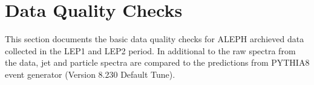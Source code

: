 \section{Data Quality Checks}

This section documents the basic data quality checks for ALEPH archieved data collected in the LEP1 and LEP2 period. In additional to the raw spectra from the data, jet and particle spectra are compared to the predictions from PYTHIA8 event generator (Version 8.230 Default Tune). 

